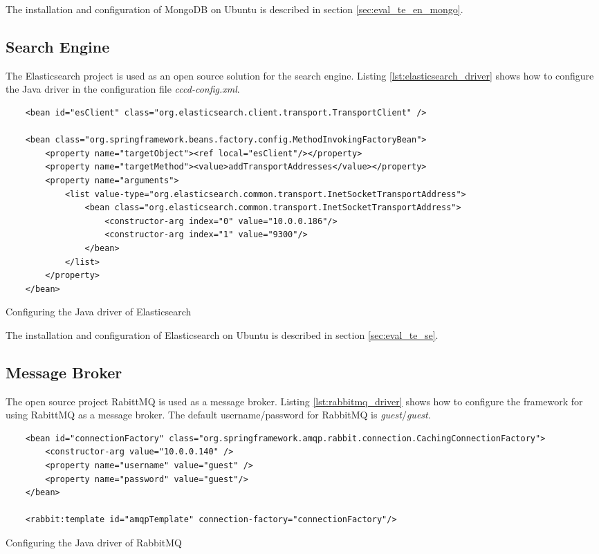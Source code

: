 The installation and configuration of MongoDB on Ubuntu is described in section \ref{sec:eval_te_en_mongo}.

\subsection{Search Engine\label{sec:impl_se_en}}
The Elasticsearch project is used as an open source solution for the search engine. Listing \ref{lst:elasticsearch_driver} shows how to configure the Java driver in the configuration file \textit{cccd-config.xml}.

\begin{code}
\begin{verbatim}
	<bean id="esClient" class="org.elasticsearch.client.transport.TransportClient" />
	
	<bean class="org.springframework.beans.factory.config.MethodInvokingFactoryBean">
		<property name="targetObject"><ref local="esClient"/></property>
		<property name="targetMethod"><value>addTransportAddresses</value></property>
		<property name="arguments"> 
			<list value-type="org.elasticsearch.common.transport.InetSocketTransportAddress">
				<bean class="org.elasticsearch.common.transport.InetSocketTransportAddress">
					<constructor-arg index="0" value="10.0.0.186"/>
					<constructor-arg index="1" value="9300"/>
				</bean>
		 	</list>
		</property>
	</bean>
\end{verbatim}
\caption{Configuring the Java driver of Elasticsearch}
\label{lst:elasticsearch_driver}
\end{code}

The installation and configuration of Elasticsearch on Ubuntu is described in section \ref{sec:eval_te_se}.

\subsection{Message Broker\label{sec:impl_mb}}
The open source project RabittMQ is used as a message broker. Listing \ref{lst:rabbitmq_driver}  shows how to configure the framework for using RabittMQ as a message broker. The default username/password for RabbitMQ is \textit{guest}/\textit{guest}.

\begin{code}
\begin{verbatim}
	<bean id="connectionFactory" class="org.springframework.amqp.rabbit.connection.CachingConnectionFactory">
	    <constructor-arg value="10.0.0.140" />
		<property name="username" value="guest" />
	    <property name="password" value="guest"/>
	</bean>
	
	<rabbit:template id="amqpTemplate" connection-factory="connectionFactory"/>
\end{verbatim}
\caption{Configuring the Java driver of RabbitMQ}
\label{lst:rabbitmq_driver}
\end{code}

